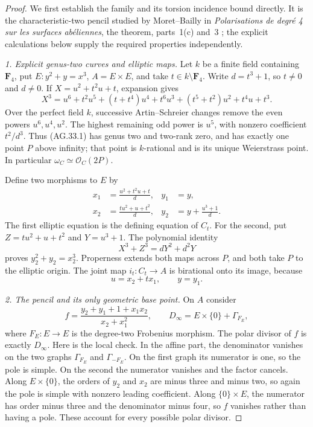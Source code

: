 \begin{proof}
We first establish the family and its torsion incidence
bound directly. It is the characteristic-two pencil
studied by Moret--Bailly in \emph{Polarisations de degr\'e 4
sur les surfaces ab\'eliennes}, the theorem, parts~1(c) and~3
\citep{AG_MoretBailly1979}; the explicit calculations below
supply the required properties independently.

\emph{1. Explicit genus-two curves and elliptic maps.}
Let $k$ be a finite field containing $\mathbf F_4$, put
$E:y^2+y=x^3$, $A=E\times E$, and take
$t\in k\setminus\mathbf F_4$. Write $d=t^3+1$, so
$t\ne0$ and $d\ne0$. If $X=u^2+t^2u+t$, expansion gives
\[
 X^3=u^6+t^2u^5+(t+t^4)u^4+t^6u^3
                +(t^5+t^2)u^2+t^4u+t^3.
\]
Over the perfect field $k$, successive Artin--Schreier
changes remove the even powers $u^6,u^4,u^2$. The highest
remaining odd power is $u^5$, with nonzero coefficient
$t^2/d^3$. Thus (AG.33.1) has genus two and two-rank zero,
and has exactly one point $P$ above infinity; that point
is $k$-rational and is its unique Weierstrass point.
In particular $\omega_C\simeq\mathcal O_C(2P)$.

Define two morphisms to $E$ by
\[
\begin{aligned}
 x_1&=\frac{u^2+t^2u+t}{d}, & y_1&=y,\\
 x_2&=\frac{tu^2+u+t^2}{d}, & y_2&=y+\frac{u^3+1}{d}.
\end{aligned}                                                   \tag{AG.33.2}
\]
The first elliptic equation is the defining equation of
$C_t$. For the second, put $Z=tu^2+u+t^2$ and $Y=u^3+1$.
The polynomial identity
\[
                 X^3+Z^3=dY^2+d^2Y
\]
proves $y_2^2+y_2=x_2^3$. Properness extends both maps
across $P$, and both take $P$ to the elliptic origin.
The joint map $i_t:C_t\to A$ is birational onto its image,
because
\[
                         u=x_2+t x_1,
                         \qquad y=y_1.                \tag{AG.33.3}
\]

\emph{2. The pencil and its only geometric base point.}
On $A$ consider
\[
 f=\frac{y_2+y_1+1+x_1x_2}{x_2+x_1^2},\qquad
 D_\infty=E\times\{0\}+\Gamma_{F_E},                 \tag{AG.33.4}
\]
where $F_E:E\to E$ is the degree-two Frobenius morphism.
The polar divisor of $f$ is exactly $D_\infty$.
Here is the local check. In the affine part, the denominator
vanishes on the two graphs $\Gamma_{F_E}$ and
$\Gamma_{-F_E}$. On the first graph its numerator is one,
so the pole is simple. On the second the numerator
vanishes and the factor cancels. Along $E\times\{0\}$,
the orders of $y_2$ and $x_2$ are minus three and minus two,
so again the pole is simple with nonzero leading coefficient.
Along $\{0\}\times E$, the numerator has order minus three
and the denominator minus four, so $f$ vanishes rather
than having a pole. These account for every possible
polar divisor.


\end{proof}
